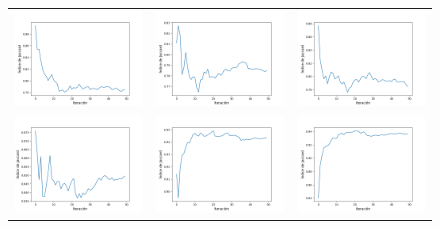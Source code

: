 \begin{figure}[h!]
    \centering
    \begin{tabular}{ccc}
        \includegraphics[width=4.5cm]{../Plots/score_epoch_0.png} &
        \includegraphics[width=4.5cm]{../Plots/score_epoch_1.png} &
        \includegraphics[width=4.5cm]{../Plots/score_epoch_2.png} \\

        \includegraphics[width=4.5cm]{../Plots/score_epoch_3.png} &
        \includegraphics[width=4.5cm]{../Plots/score_epoch_4.png} &
        \includegraphics[width=4.5cm]{../Plots/score_epoch_5.png} \\


\end{tabular}
\end{figure}
